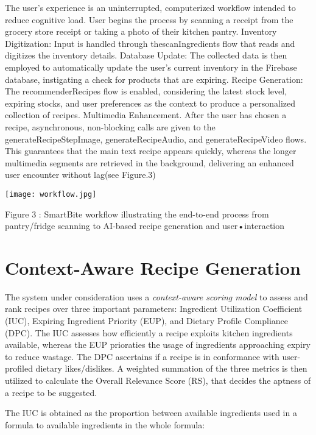 \documentclass[conference]{IEEEtran}
\begin{document}
The user's experience is an uninterrupted, computerized workflow intended to reduce cognitive load.
User begins the process by scanning a receipt from the grocery store receipt or taking a photo of their kitchen pantry.
Inventory Digitization: Input is handled through thescanIngredients flow that reads and digitizes the inventory details.
Database Update: The collected data is then employed to automatically update the user's current inventory in the Firebase database, instigating a check for products that are expiring.
Recipe Generation: The recommenderRecipes flow is enabled, considering the latest stock level, expiring stocks, and user preferences as the context to produce a personalized collection of recipes.
Multimedia Enhancement. After the user has chosen a recipe, asynchronous, non-blocking calls are given to the generateRecipeStepImage, generateRecipeAudio, and generateRecipeVideo flows. This guarantees that the main text recipe appears quickly, whereas the longer multimedia segments are retrieved in the background, delivering an enhanced user encounter without lag(see Figure.3)



\texttt{[image: workflow.jpg]}
\begin{center}
    Figure 3 : SmartBite workflow illustrating the end-to-end process from pantry/fridge scanning to AI-based recipe generation
and user•interaction
\end{center}

\section{Context-Aware Recipe Generation}

The system under consideration uses a \textit{context-aware scoring model} to assess and rank recipes over three important parameters: Ingredient Utilization Coefficient (IUC), Expiring Ingredient Priority (EUP), and Dietary Profile Compliance (DPC). The IUC assesses how efficiently a recipe exploits kitchen ingredients available, whereas the EUP prioraties the usage of ingredients approaching expiry to reduce wastage. The DPC ascertains if a recipe is in conformance with user-profiled dietary likes/dislikes. A weighted summation of the three metrics is then utilized to calculate the Overall Relevance Score (RS), that decides the aptness of a recipe to be suggested.

The IUC is obtained as the proportion between available ingredients used in a formula to available ingredients in the whole formula:
\end{document}
